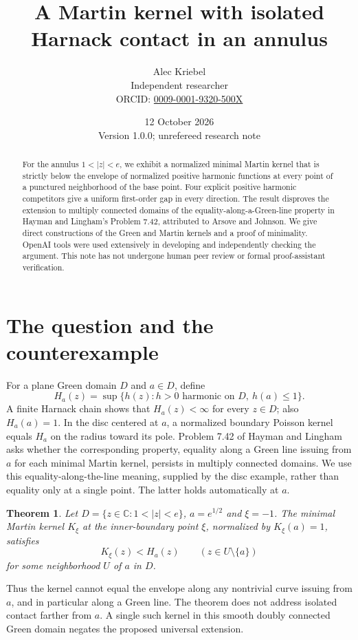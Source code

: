 \documentclass[11pt]{article}
\title{A Martin kernel with isolated Harnack contact in an annulus}
\author{Alec Kriebel\\\small Independent researcher\\
\small ORCID: \href{https://orcid.org/0009-0001-9320-500X}{0009-0001-9320-500X}}
\date{12 October 2026\\\small Version 1.0.0; unrefereed research note}
\newtheorem{theorem}{Theorem}
\begin{document}
\maketitle
\begin{abstract}
For the annulus $1<|z|<e$, we exhibit a normalized minimal Martin kernel that is strictly below the envelope of normalized positive harmonic functions at every point of a punctured neighborhood of the base point. Four explicit positive harmonic competitors give a uniform first-order gap in every direction. The result disproves the extension to multiply connected domains of the equality-along-a-Green-line property in Hayman and Lingham's Problem 7.42, attributed to Arsove and Johnson. We give direct constructions of the Green and Martin kernels and a proof of minimality. OpenAI tools were used extensively in developing and independently checking the argument. This note has not undergone human peer review or formal proof-assistant verification.
\end{abstract}

\section{The question and the counterexample}
For a plane Green domain $D$ and $a\in D$, define
\[
 H_a(z)=\sup\{h(z):h>0\text{ harmonic on }D,\ h(a)\leq1\}.
\]
A finite Harnack chain shows that $H_a(z)<\infty$ for every $z\in D$; also $H_a(a)=1$. In the disc centered at $a$, a normalized boundary Poisson kernel equals $H_a$ on the radius toward its pole. Problem 7.42 of Hayman and Lingham~\cite{HL} asks whether the corresponding property, equality along a Green line issuing from $a$ for each minimal Martin kernel, persists in multiply connected domains. We use this equality-along-the-line meaning, supplied by the disc example, rather than equality only at a single point. The latter holds automatically at $a$.

\begin{theorem}\label{thm:main}
Let $D=\{z\in\mathbb C:1<|z|<e\}$, $a=e^{1/2}$ and $\xi=-1$. The minimal Martin kernel $K_\xi$ at the inner-boundary point $\xi$, normalized by $K_\xi(a)=1$, satisfies
\[
 K_\xi(z)<H_a(z)\qquad(z\in U\setminus\{a\})
\]
for some neighborhood $U$ of $a$ in $D$.
\end{theorem}

Thus the kernel cannot equal the envelope along any nontrivial curve issuing from $a$, and in particular along a Green line. The theorem does not address isolated contact farther from $a$. A single such kernel in this smooth doubly connected Green domain negates the proposed universal extension.
\end{document}

